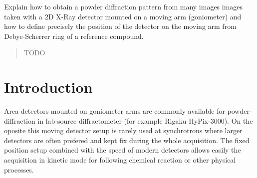 \documentclass{iucr}              %
\begin{document}

\maketitle                        %

\begin{synopsis}
Explain how to obtain a powder diffraction pattern from
many images images taken with a 2D X-Ray detector mounted on a moving arm
(goniometer) and how to define precisely the position of the detector on the
moving arm from Debye-Scherrer ring of a reference compound.
\end{synopsis}

\begin{abstract}
TODO
\end{abstract}




\section{Introduction}

Area detectors mounted on goniometer arms are commonly available for
powder-diffraction in lab-source diffractometer (for example Rigaku
HyPix-3000).
On the oposite this moving detector setup is rarely used at synchrotrons where
larger detectors are often prefered and kept fix during the whole acquisition.
The fixed position setup combined with the speed of modern detectors allows
easily the acquisition in kinetic mode for following chemical reaction or other
physical processes.
\end{document}
